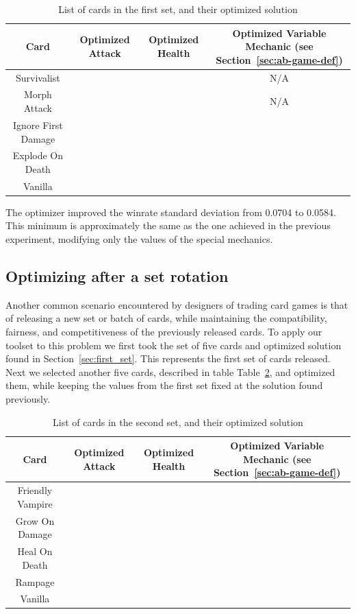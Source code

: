 \begin{table}[t]
\centering
\begin{tabular}{||c c c c||} 
 \hline
 Card & Optimized Attack & Optimized Health & Optimized Variable Mechanic (see Section~\ref{sec:ab-game-def})\\ [0.5ex]
 \hline
 Survivalist &  &  & N/A \\
 \hline
 Morph Attack &  &  & N/A \\
 \hline
 Ignore First Damage &  &  & \\
 \hline
 Explode On Death &  &  &  \\ 
 \hline
 Vanilla &  &  &  \\
 \hline
\end{tabular}
\caption{List of cards in the first set, and their optimized solution}
\label{tab:first_set}
\end{table}

The optimizer improved the winrate standard deviation from 0.0704 to 0.0584. This minimum is approximately the same as the one achieved in the previous experiment, modifying only the values of the special mechanics. 

\subsection{Optimizing after a set rotation}

Another common scenario encountered by designers of trading card games is that of releasing a new set or batch of cards, while maintaining the compatibility, fairness, and competitiveness of the previously released cards. To apply our toolset to this problem we first took the set of five cards and optimized solution found in Section~\ref{sec:first_set}. This represents the first set of cards released. Next we selected another five cards, described in table Table~\ref{tab:second_set}, and optimized them, while keeping the values from the first set fixed at the solution found previously. 


\begin{table}[t]
\centering
\begin{tabular}{||c c c c||} 
 \hline
 Card & Optimized Attack & Optimized Health & Optimized Variable Mechanic (see Section~\ref{sec:ab-game-def})\\ [0.5ex]
 \hline
 Friendly Vampire &  &  &  \\
 \hline
 Grow On Damage &  &  &  \\
 \hline
 Heal On Death &  &  & \\
 \hline
 Rampage &  &  &  \\ 
 \hline
 Vanilla &  &  &  \\
 \hline
\end{tabular}
\caption{List of cards in the second set, and their optimized solution}
\label{tab:second_set}
\end{table}



